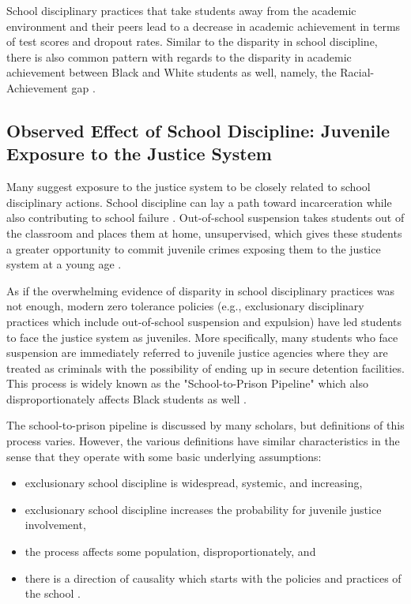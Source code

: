 \documentclass[12pt]{article}
\begin{document}
School disciplinary practices that take students away from the academic environment and their peers lead to a decrease in academic achievement in terms of test scores and dropout rates. Similar to the disparity in school discipline, there is also common pattern with regards to the disparity in academic achievement between Black and White students as well, namely, the Racial-Achievement gap \cite{Lee2002}. 



\subsection*{Observed Effect of School Discipline: Juvenile Exposure to the Justice System}
Many suggest exposure to the justice system to be closely related to school disciplinary actions. School discipline can lay a path toward incarceration while also contributing to school failure \cite{Okonofua2015}. Out-of-school suspension takes students out of the classroom and places them at home, unsupervised, which gives these students a greater opportunity to commit juvenile crimes exposing them to the justice system at a young age \cite{Jacob2003}. 

As if the overwhelming evidence of disparity in school disciplinary practices was not enough, modern zero tolerance policies (e.g., exclusionary disciplinary practices which include out-of-school suspension and expulsion) have led students to face the justice system as juveniles. More specifically, many students who face suspension are immediately referred to juvenile justice agencies where they are treated as criminals with the possibility of ending up in secure detention facilities. This process is widely known as the "School-to-Prison Pipeline" which also disproportionately affects Black students as well \cite{Schiff2013}.  

The school-to-prison pipeline is discussed by many scholars, but definitions of this process varies. However, the various definitions have similar characteristics in the sense that they operate with some basic underlying assumptions: 
\begin{itemize}
  \item exclusionary school discipline is widespread, systemic, and increasing, 
  \item exclusionary school discipline increases the probability for juvenile justice involvement,
  \item the process affects some population, disproportionately, and 
  \item there is a direction of causality which starts with the policies and practices of the school \cite{Skiba2014}. 
\end{itemize}
\end{document}
